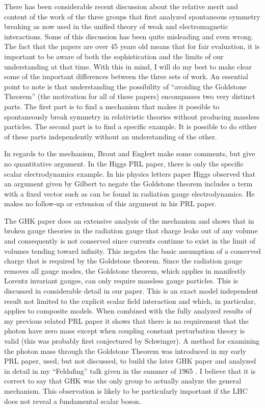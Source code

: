 \documentclass[preprintnumbers,12pt]{revtex4-2}
\begin{document}
There has been considerable recent discussion about the relative merit
and content of the work of the three groups that first analyzed
spontaneous symmetry breaking as now used in the unified theory of
weak and electromagnetic interactions. Some of this discussion has
been quite misleading and even wrong. The fact that the papers are
over 45 years old means that for fair evaluation, it is important to
be aware of both the sophistication and the limits of our
understanding at that time. With this in mind, I will do my best to
make clear some of the important differences between the three sets of
work. An essential point to note is that understanding the
possibility of ``avoiding the Goldstone Theorem'' (the motivation for
all of these papers) encompasses two very distinct parts. The first
part is to find a mechanism that makes it possible to spontaneously
break symmetry in relativistic theories without producing massless
particles.  The second part is to find a specific example. It is
possible to do either of these parts independently without an
understanding of the other.

In regards to the mechanism, Brout and Englert make some comments, but
give no quantitative argument. In the Higgs PRL paper, there is only
the specific scalar electrodynamics example. In his physics letters
paper Higgs observed that an argument given by Gilbert to negate the
Goldstone theorem includes a term with a fixed vector such as can be
found in radiation gauge electrodynamics. He makes no follow-up or
extension of this argument in his PRL paper.

The GHK paper does an extensive analysis of the mechanism and shows
that in broken gauge theories in the radiation gauge that charge leaks
out of any volume and consequently is not conserved since currents
continue to exist in the limit of volumes tending toward infinity. This negates
the basic assumption of a conserved charge that is required by the
Goldstone theorem. Since the radiation gauge removes all gauge modes,
the Goldstone theorem, which applies in manifestly Lorentz invariant gauges, can only require massless
gauge particles. This is discussed in considerable detail in our
paper.  This is an exact model independent result not limited to the
explicit scalar field interaction and which, in particular, applies to
composite models. When combined with the fully analyzed results of my
previous related PRL paper it shows that there is no requirement that
the photon have zero mass except when coupling constant perturbation
theory is valid (this was probably first conjectured by Schwinger). A
method for examining the photon mass through the Goldstone Theorem was
introduced in my early PRL paper, used, but not discussed, to build the
later GHK paper and analyzed in detail in my ``Feldafing'' talk given
in the summer of 1965 \cite{hc;1965}. I believe that it is correct to say that GHK
was the only group to actually analyze the general mechanism. This observation is likely
to be particularly important if the LHC does not reveal a fundamental scalar boson.
\end{document}
